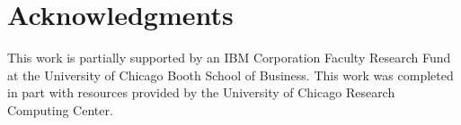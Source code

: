 \documentclass[11pt]{article}
\numberwithin{equation}{section}
\numberwithin{theorem}{section}
\begin{document}
\title{}
\author{} 
\date{First draft: ...}


\maketitle

\begin{abstract}

\end{abstract}



\newpage


\section*{Acknowledgments}

This work is partially supported by an IBM Corporation Faculty
Research Fund at the University of Chicago Booth School of Business.
This work was completed in part with resources provided by the
University of Chicago Research Computing Center.



{


}


\appendix
\end{document}
